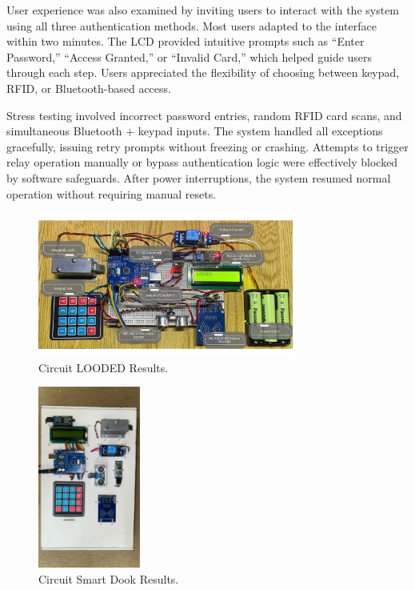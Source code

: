 \documentclass[conference, onecolumn]{IEEEtran}
\begin{document}
User experience was also examined by inviting users to interact with the system using all three authentication methods. Most users adapted to the interface within two minutes. The LCD provided intuitive prompts such as “Enter Password,” “Access Granted,” or “Invalid Card,” which helped guide users through each step. Users appreciated the flexibility of choosing between keypad, RFID, or Bluetooth-based access.

Stress testing involved incorrect password entries, random RFID card scans, and simultaneous Bluetooth + keypad inputs. The system handled all exceptions gracefully, issuing retry prompts without freezing or crashing. Attempts to trigger relay operation manually or bypass authentication logic were effectively blocked by software safeguards. After power interruptions, the system resumed normal operation without requiring manual resets.

\begin{figure}[H]
	\centering
	\includegraphics[width=0.75\textwidth]{mohinhdemo.jpg}
	\caption{Circuit LOODED Results.}
	\label{fig11}
\end{figure}	

\begin{figure}[H]
	\centering
	\includegraphics[width=0.3\textwidth]{FN.pdf}
	\caption{Circuit Smart Dook Results.}
	\label{fig12}
\end{figure}	
\end{document}
